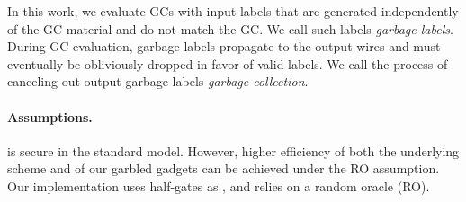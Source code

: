 In this work, we evaluate GCs  with input labels that are generated independently of the GC material and do not match the GC.
We call such labels {\em garbage labels}.
During GC evaluation,  garbage labels propagate to the output wires and must eventually  be obliviously dropped in favor of valid labels.
We call the process of canceling out output garbage labels {\em garbage collection}.

\paragraph{Assumptions.}  
\ourschemelong is secure in the standard model. However, higher
efficiency of both the underlying scheme \underscheme and of our
garbled gadgets can be achieved under the RO assumption.  Our
implementation uses half-gates as \underscheme, and relies on a random oracle (RO).


